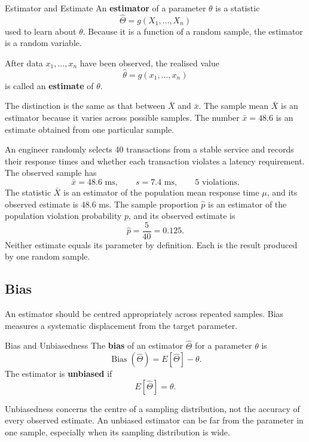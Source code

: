 \begin{definition}{Estimator and Estimate}
An \textbf{estimator} of a parameter $\theta$ is a statistic
\[
    \widehat\Theta=g(X_1,\ldots,X_n)
\]
used to learn about $\theta$. Because it is a function of a random sample, the estimator is a random variable.

After data $x_1,\ldots,x_n$ have been observed, the realised value
\[
    \widehat\theta=g(x_1,\ldots,x_n)
\]
is called an \textbf{estimate} of $\theta$.
\end{definition}

The distinction is the same as that between $\bar X$ and $\bar x$. The sample mean $\bar X$ is an estimator because it varies across possible samples. The number $\bar x=48.6$ is an estimate obtained from one particular sample.

\begin{example}\par
An engineer randomly selects 40 transactions from a stable service and records their response times and whether each transaction violates a latency requirement. The observed sample has
\[
    \bar x=48.6\text{ ms},
    \qquad
    s=7.4\text{ ms},
    \qquad
    5\text{ violations}.
\]
The statistic $\bar X$ is an estimator of the population mean response time $\mu$, and its observed estimate is $48.6$ ms. The sample proportion $\widehat p$ is an estimator of the population violation probability $p$, and its observed estimate is
\[
    \widehat p=\frac{5}{40}=0.125.
\]
Neither estimate equals its parameter by definition. Each is the result produced by one random sample.
\end{example}

\subsection{Bias}

An estimator should be centred appropriately across repeated samples. Bias measures a systematic displacement from the target parameter.

\begin{definition}{Bias and Unbiasedness}
The \textbf{bias} of an estimator $\widehat\Theta$ for a parameter $\theta$ is
\[
    \operatorname{Bias}(\widehat\Theta)
      =E[\widehat\Theta]-\theta.
\]
The estimator is \textbf{unbiased} if
\[
    E[\widehat\Theta]=\theta.
\]
\end{definition}

Unbiasedness concerns the centre of a sampling distribution, not the accuracy of every observed estimate. An unbiased estimator can be far from the parameter in one sample, especially when its sampling distribution is wide.

